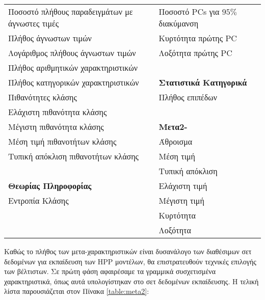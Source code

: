 \begin{itemize}
\begin{table}[!htb]
\begin{center}
{\begin{tabular}{ |l|l| }
					Ποσοστό πλήθους παραδειγμάτων με άγνωστες τιμές &  Ποσοστό \gls{PC}s για $95\%$ διακύμανση\\
					Πλήθος άγνωστων τιμών &Κυρτότητα πρώτης \gls{PC} \\
					Λογάριθμος πλήθους άγνωστων τιμών&Λοξότητα πρώτης \gls{PC} \\
					Πλήθος αριθμητικών χαρακτηριστικών &  \\
					Πλήθος κατηγορικών χαρακτηριστικών & \textbf{Στατιστικά Kατηγορικά}\\
					Πιθανότητες κλάσης & Πλήθος επιπέδων \\
					Ελάχιστη πιθανότητα κλάσης & \\
					Μέγιστη πιθανότητα κλάσης & \textbf{Μετα2-}\\
					Μέση τιμή πιθανοτήτων κλάσης& Άθροισμα\\
					Τυπική απόκλιση πιθανοτήτων κλάσης & Μέση τιμή\\
					& Τυπική απόκλιση\\
					\textbf{Θεωρίας Πληροφορίας}  & Ελάχιστη τιμή\\
					Εντροπία Κλάσης & Μέγιστη τιμή\\
				    &	 Κυρτότητα\\
				    & Λοξότητα\\				
					\hline
				\end{tabular}}   
			\end{center}
				\end{table}
				
Καθώς το πλήθος των μετα-χαρακτηριστικών είναι δυσανάλογο των διαθέσιμων σετ δεδομένων για εκπαίδευση των \gls{HPP} μοντέλων, θα επιστρατευθούν τεχνικές επιλογής των βέλτιστων. Σε πρώτη φάση αφαιρέσαμε τα γραμμικά συσχετισμένα χαρακτηριστικά, όπως αυτά υπολογίστηκαν στο σετ δεδομένων εκπαίδευσης. H τελική λίστα παρουσιάζεται στον Πίνακα \ref{table:meta2}:	


\end{itemize}
